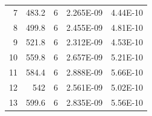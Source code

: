 \documentclass[a4paper,11pt]{article}
\begin{document}
\begin{table}[htpb]
\begin{tabular}{rrrrr}
				\rowcolor[HTML]{C0C0C0} 
				\cellcolor[HTML]{BBDAFF}7                    & 483.2                      & 6                                                      & 2.265E-09                                                                              & 4.44E-10                                                  \\
				\rowcolor[HTML]{EFEFEF} 
				\cellcolor[HTML]{BBDAFF}8                    & 499.8                      & 6                                                      & 2.455E-09                                                                              & 4.81E-10                                                  \\
				\rowcolor[HTML]{C0C0C0} 
				\cellcolor[HTML]{BBDAFF}9                    & 521.8                      & 6                                                      & 2.312E-09                                                                              & 4.53E-10                                                  \\
				\rowcolor[HTML]{EFEFEF} 
				\cellcolor[HTML]{BBDAFF}10                   & 559.8                      & 6                                                      & 2.657E-09                                                                              & 5.21E-10                                                  \\
				\rowcolor[HTML]{C0C0C0} 
				\cellcolor[HTML]{BBDAFF}11                   & 584.4                      & 6                                                      & 2.888E-09                                                                              & 5.66E-10                                                  \\
				\rowcolor[HTML]{EFEFEF} 
				\cellcolor[HTML]{BBDAFF}12                   & 542                        & 6                                                      & 2.561E-09                                                                              & 5.02E-10                                                  \\
				\rowcolor[HTML]{C0C0C0} 
				\cellcolor[HTML]{BBDAFF}13                   & 599.6                      & 6                                                      & 2.835E-09                                                                              & 5.56E-10                                                 
			\end{tabular}
		\end{table}
		
\end{document}
